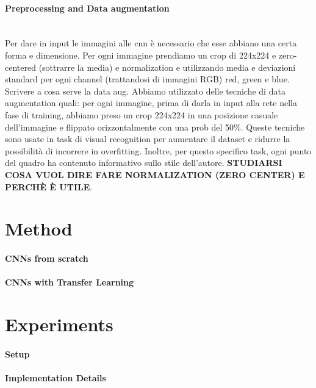 \documentclass{article}
\begin{document}
\paragraph{Preprocessing and Data augmentation}\mbox{}\\
Per dare in input le immagini alle cnn è necessario che esse abbiano una certa forma e dimensione. Per ogni immagine prendiamo un crop di 224x224 e zero-centered (sottrarre la media) e normalization e utilizzando media e deviazioni standard per ogni channel (trattandosi di immagini RGB) red, green e blue. \\
Scrivere a cosa serve la data aug. Abbiamo utilizzato delle tecniche di data augmentation quali: per ogni immagine, prima di darla in input alla rete nella fase di training, abbiamo preso un crop 224x224 in una posizione casuale dell'immagine e flippato orizzontalmente con una prob del 50\%. Queste tecniche sono usate in task di visual recognition per aumentare il dataset e ridurre la possibilità di incorrere in overfitting.
Inoltre, per questo specifico task, ogni punto del quadro ha contenuto informativo sullo stile dell'autore.
\textbf{STUDIARSI COSA VUOL DIRE FARE NORMALIZATION (ZERO CENTER) E PERCHÈ È UTILE}.

\section{Method}

\paragraph{CNNs from scratch}

\paragraph{CNNs with Transfer Learning}


\section{Experiments}

\paragraph{Setup}

\paragraph{Implementation Details}
\end{document}
